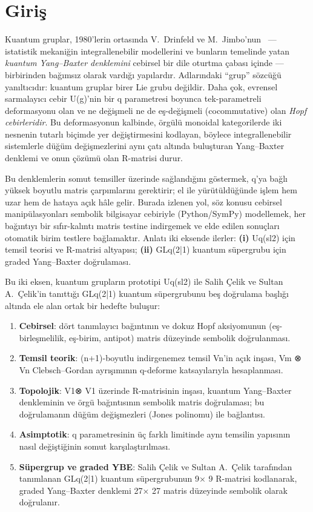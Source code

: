 \documentclass[12pt,a4paper]{report}
\numberwithin{equation}{chapter}
\theoremstyle{plain}
\theoremstyle{definition}
\begin{document}
\chapter{Giriş}

Kuantum gruplar, 1980'lerin ortasında V.~Drinfeld ve M.~Jimbo'nun~\cite{Drinfeld,Jimbo,KS} --- istatistik
mekaniğin integrallenebilir modellerini ve bunların temelinde yatan
\emph{kuantum Yang--Baxter denklemini} cebirsel bir dile oturtma çabası içinde ---
birbirinden bağımsız olarak vardığı yapılardır. Adlarındaki ``grup'' sözcüğü
yanıltıcıdır: kuantum gruplar birer Lie grubu değildir. Daha çok, evrensel
sarmalayıcı cebir U(g)'nin bir q parametresi boyunca tek-parametreli
deformasyonu olan ve ne değişmeli ne de eş-değişmeli (cocommutative) olan
\emph{Hopf cebirleridir}. Bu deformasyonun kalbinde, örgülü monoidal
kategorilerde iki nesnenin tutarlı biçimde yer değiştirmesini kodlayan, böylece
integrallenebilir sistemlerle düğüm değişmezlerini aynı çatı altında buluşturan
Yang--Baxter denklemi ve onun çözümü olan R-matrisi durur.

Bu denklemlerin somut temsiller üzerinde sağlandığını göstermek, q'ya bağlı
yüksek boyutlu matris çarpımlarını gerektirir; el ile yürütüldüğünde işlem hem
uzar hem de hataya açık hâle gelir. Burada izlenen yol, söz konusu cebirsel
manipülasyonları sembolik bilgisayar cebiriyle (Python/SymPy) modellemek, her
bağıntıyı bir sıfır-kalıntı matris testine indirgemek ve elde edilen sonuçları
otomatik birim testlere bağlamaktır. Anlatı iki eksende ilerler: \textbf{(i)}
Uq(sl2) için temsil teorisi ve R-matrisi altyapısı; \textbf{(ii)} GLq(2|1)
kuantum süpergrubu için graded Yang--Baxter doğrulaması.

Bu iki eksen, kuantum grupların prototipi Uq(sl2) ile Salih Çelik ve Sultan A.\ Çelik'in tanıttığı
GLq(2|1) kuantum süpergrubunu beş doğrulama başlığı altında ele alan ortak bir
hedefte buluşur:
\begin{enumerate}[leftmargin=*]
  \item \textbf{Cebirsel}: dört tanımlayıcı bağıntının ve dokuz Hopf
        aksiyomunun (eş-birleşmelilik, eş-birim, antipot) matris düzeyinde
        sembolik doğrulanması.
  \item \textbf{Temsil teorik}: (n+1)-boyutlu indirgenemez temsil Vn'in
        açık inşası, Vm ⊗ Vn Clebsch--Gordan ayrışımının q-deforme
        katsayılarıyla hesaplanması.
  \item \textbf{Topolojik}: V1⊗ V1 üzerinde R-matrisinin
        inşası, kuantum Yang--Baxter denkleminin ve örgü bağıntısının
        sembolik matris doğrulaması; bu doğrulamanın düğüm değişmezleri (Jones
        polinomu) ile bağlantısı.
  \item \textbf{Asimptotik}: q parametresinin üç farklı limitinde aynı
        temsilin yapısının nasıl değiştiğinin somut karşılaştırılması.
  \item \textbf{Süpergrup ve graded YBE}: Salih Çelik ve Sultan A.\ Çelik tarafından tanımlanan
        GLq(2|1) kuantum süpergrubunun 9× 9 R-matrisi kodlanarak,
        graded Yang--Baxter denklemi 27× 27 matris düzeyinde sembolik
        olarak doğrulanır.
\end{enumerate}
\end{document}
